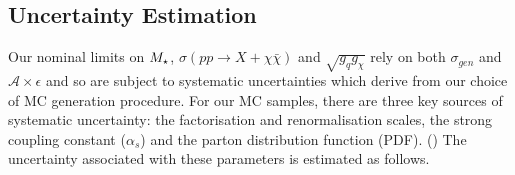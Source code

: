 




\subsection{Uncertainty Estimation}
Our nominal limits on $M_{\star}$, $\sigma(pp \rightarrow{X} + \chi\bar{\chi})$ and $\sqrt{g_{q}g_{\chi}}$ rely on both $\sigma_{gen}$ and $\mathcal{A}\times\epsilon$ and so are subject to systematic uncertainties which derive from our choice of MC generation procedure. For our MC samples, there are three key sources of systematic uncertainty: the factorisation and renormalisation scales, the strong coupling constant ($\alpha_{s}$) and the parton distribution function (PDF). () The uncertainty associated with these parameters is estimated as follows.

